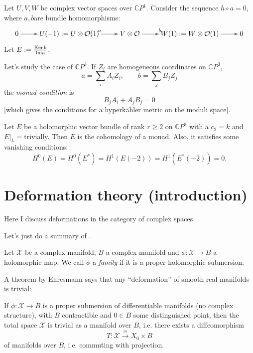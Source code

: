 \begin{definition}[Monad]
\label{definition-monad}
Let $U,V,W$ be complex vector spaces over $\mathbb{C}P^1$.
Consider the sequence $h \circ a=0$, where $a,b$are bundle homomorphisms:
$$
\xymatrix{
0\ar[r]&U(-1):=U \otimes \mathcal{O}(1)
\ar[r]^a
& V \otimes \mathcal{O}
\ar[r]^b
& W(1):=W \otimes \mathcal{O}(1)\ar[r]&0
}
$$
Let $E:=\frac{\mathop{\mathrm{Ker}} b}{\text{Im}a}$.
\end{definition}

\medskip\noindent
Let's study the case of $\mathbb{C}P^3$.
If $Z_i$ are homogeneous coordinates on $\mathbb{C}P^3$,
$$
a=\sum_i A_iZ_i,\qquad b=\sum_jB_jZ_j
$$
the {\it monad condition} is
$$
B_jA_i+A_jB_j=0
$$
[which gives the conditions for a hyperkähler metric on the moduli space].

\begin{theorem}
\label{theorem-bbh}
Let $E$ be a holomorphic vector bundle of rank $r \geq 2$
on $\mathbb{C}P^3$ with a $c_2=k$ and $E|_L=$trivially.
Then $E$ is the cohomology of a monad.
Also, it satisfies some vanishing conditions:
$$
H^0(E)=H^0(E^*)=H^1(E(-2))=H^1(E^*(-2))=0.
$$
\end{theorem}






\section{Deformation theory (introduction)}
\label{section-deformations}

\noindent
Here I discuss deformations in the category of complex spaces.

Let's just do a summary of \cite[Chapter 9]{Voisin}.

Let $\mathcal{X}$ be a complex manifold, $B$ a complex manifold
and $\phi:\mathcal{X} \to B$ a holomorphic map.
We call $\phi$ a {\it family} if it is a proper holomorphic submersion.

A theorem by Ehresmann says that any ``deformation'' of
smooth real manifolds is trivial:

\begin{theorem}[Ehresmann]
\label{theorem-ehresmann}
\begin{reference}
\cite[Theorem 9.3]{Voisin}
\end{reference}
If $\phi:\mathcal{X} \to B$ is a
proper submersion of differentiable manifolds
(no complex structure), with $B$ contractible and $0 \in B$ 
some distinguished point,
then the total space $\mathcal{X}$ is trivial as a 
manifold over $B$, i.e.
there exists a diffeomorphism
 $$
T:\mathcal{X}\xrightarrow{\cong}X_0 \times B
$$
of manifolds over $B$, i.e. commuting with projection.
\end{theorem}


